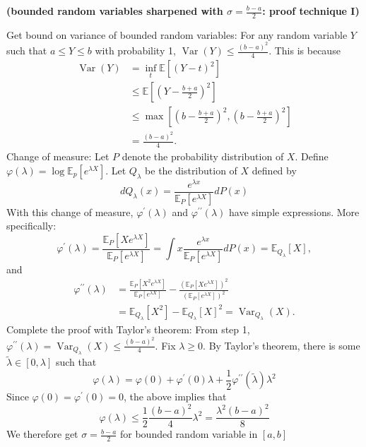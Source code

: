 \documentclass{article}
\newcommand{\bfs}[1]{\textbf{({#1})}}
\begin{document}
\begin{rema}{\bfs{bounded random variables sharpened with  $\sigma=\frac{b-a}{2}$: proof technique I}}\label{remaba}

 Get bound on variance of bounded random variables: For any random variable $Y$ such that $a \leq Y \leq b$ with probability 1, $\operatorname{Var}(Y) \leq \frac{(b-a)^{2}}{4}$. This is because
$$
\begin{aligned}
\operatorname{Var}(Y) &=\inf _{t} \mathbb{E}\left[(Y-t)^{2}\right] \\
& \leq \mathbb{E}\left[\left(Y-\frac{b+a}{2}\right)^{2}\right] \\
& \leq \max \left[\left(b-\frac{b+a}{2}\right)^{2},\left(b-\frac{b+a}{2}\right)^{2}\right] \\
&=\frac{(b-a)^{2}}{4} .
\end{aligned}
$$
 Change of measure: Let $P$ denote the probability distribution of $X$. Define $\varphi(\lambda)=\log \mathbb{E}_{p}\left[e^{\lambda X}\right]$. Let $Q_{\lambda}$ be the distribution of $X$ defined by
$$
d Q_{\lambda}(x)=\frac{e^{\lambda x}}{\mathbb{E}_{P}\left[e^{\lambda X}\right]} d P(x)
$$
With this change of measure, $\varphi^{\prime}(\lambda)$ and $\varphi^{\prime \prime}(\lambda)$ have simple expressions. More specifically:
$$
\varphi^{\prime}(\lambda)=\frac{\mathbb{E}_{P}\left[X e^{\lambda X}\right]}{\mathbb{E}_{P}\left[e^{\lambda X}\right]}=\int x \frac{e^{\lambda x}}{\mathbb{E}_{P}\left[e^{\lambda X}\right]} d P(x)=\mathbb{E}_{Q_{\lambda}}[X],
$$
and
$$
\begin{aligned}
\varphi^{\prime \prime}(\lambda) &=\frac{\mathbb{E}_{P}\left[X^{2} e^{\lambda X}\right]}{\mathbb{E}_{P}\left[e^{\lambda X}\right]}-\frac{\left(\mathbb{E}_{P}\left[X e^{\lambda X}\right]\right)^{2}}{\left(\mathbb{E}_{P}\left[e^{\lambda X}\right]\right)^{2}} \\
&=\mathbb{E}_{Q_{\lambda}}\left[X^{2}\right]-\mathbb{E}_{Q_{\lambda}}[X]^{2}=\operatorname{Var}_{Q_{\lambda}}(X) .
\end{aligned}
$$
 Complete the proof with Taylor's theorem: From step 1, $\varphi^{\prime \prime}(\lambda)=\operatorname{Var}_{Q_{\lambda}}(X) \leq \frac{(b-a)^{2}}{4}$. Fix $\lambda \geq 0 .$ By Taylor's theorem, there is some $\tilde{\lambda} \in[0, \lambda]$
such that
$$
\varphi(\lambda)=\varphi(0)+\varphi^{\prime}(0) \lambda+\frac{1}{2} \varphi^{\prime \prime}(\tilde{\lambda}) \lambda^{2}
$$
Since $\varphi(0)=\varphi^{\prime}(0)=0$, the above implies that
$$
\varphi(\lambda) \leq \frac{1}{2} \frac{(b-a)^{2}}{4} \lambda^{2}=\frac{\lambda^{2}(b-a)^{2}}{8}
$$
We therefore get $\sigma=\frac{b-a}{2}$ for bounded random variable in $[a, b]$
\end{rema}
\end{document}
